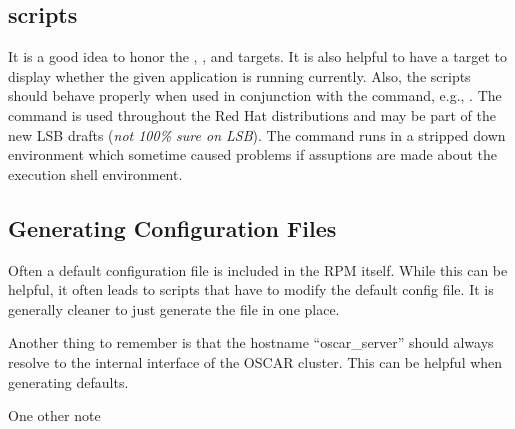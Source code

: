 \subsection{ scripts}

It is a good idea to honor the , , and 
targets.  It is also helpful to have a  target to display
whether the given application is running currently.  Also, the scripts
should behave properly when used in conjunction with the 
command, e.g., .  The  command is
used throughout the Red Hat distributions and may be part of the new LSB
drafts (\emph{not 100\% sure on LSB}).  The command runs in a stripped down
environment which sometime caused problems if assuptions are made about the
execution shell environment.




\subsection{Generating Configuration Files}

Often a default configuration file is included in the RPM itself.  While
this can be helpful, it often leads to scripts that have to modify the
default config file.  It is generally cleaner to just generate the file in
one place.  

Another thing to remember is that the hostname ``oscar\_server'' should
always resolve to the internal interface of the OSCAR cluster.  This can be
helpful when generating defaults.

One other note 
